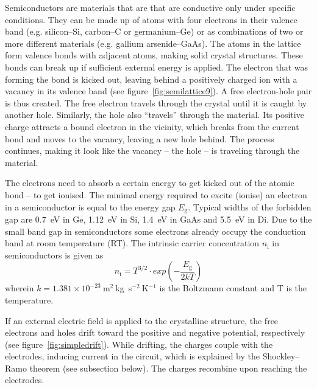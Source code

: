 Semiconductors are materials that are that are conductive only under specific conditions. They can be made up of atoms with four electrons in their valence band (e.g. silicon--Si, carbon--C or germanium--Ge) or as combinations of two or more different materials (e.g. gallium arsenide--GaAs). The atoms in the lattice form valence bonds with adjacent atoms, making solid crystal structures. These bonds can break up if sufficient external energy is applied. The electron that was forming the bond is kicked out, leaving behind a positively charged ion with a vacancy in its valence band (see figure~\ref{fig:semilattice9}). A free electron-hole pair is thus created. The free electron travels through the crystal until it is caught by another hole. Similarly, the hole also ``travels'' through the material. Its positive charge attracts a bound electron in the vicinity, which breaks from the current bond and moves to the vacancy, leaving a new hole behind. The process continues, making it look like the vacancy -- the hole -- is traveling through the material.




The electrons need to absorb a certain energy to get kicked out of the atomic bond -- to get ionised. The minimal energy required to excite (ionise) an electron in a semiconductor is equal to the energy gap $E_\mathrm{g}$. Typical widths of the forbidden gap are 0.7~eV in Ge, 1.12~eV in Si, 1.4~eV in GaAs and 5.5~eV in Di. Due to the small band gap in semiconductors some electrons already occupy the conduction band at room temperature (RT). The intrinsic carrier concentration $n_\mathrm{i}$ in semiconductors is given as
\begin{equation}
\label{eq:intrinsiccarrier}
n_\mathrm{i} = T^{3/2} \cdot exp(-\frac{E_\mathrm{g}}{2kT}) 
\end{equation} 
wherein $k = 1.381\times10^{-23}~$m$^2~$kg~s$^{-2}~$K$^{-1}$ is the Boltzmann constant and T is the temperature. 

If an external electric field is applied to the crystalline structure, the free electrons and holes drift toward the positive and negative potential, respectively (see figure~\ref{fig:simpledrift}). While drifting, the charges couple with the electrodes, inducing current in the circuit, which is explained by the Shockley--Ramo theorem (see subsection below). The charges recombine upon reaching the electrodes.

